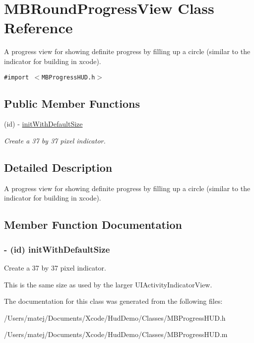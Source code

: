 \hypertarget{interface_m_b_round_progress_view}{
\section{MBRoundProgressView Class Reference}
\label{interface_m_b_round_progress_view}
}
A progress view for showing definite progress by filling up a circle (similar to the indicator for building in xcode).  


{\tt \#import $<$MBProgressHUD.h$>$}

\subsection*{Public Member Functions}
\begin{CompactItemize}
\item 
(id) - \hyperlink{interface_m_b_round_progress_view_a4794160e36b8a16ce1dd444072433e9}{initWithDefaultSize}
\begin{CompactList}\small\item\em Create a 37 by 37 pixel indicator. \item\end{CompactList}\end{CompactItemize}


\subsection{Detailed Description}
A progress view for showing definite progress by filling up a circle (similar to the indicator for building in xcode). 

\subsection{Member Function Documentation}
\hypertarget{interface_m_b_round_progress_view_a4794160e36b8a16ce1dd444072433e9}{
\subsubsection[{initWithDefaultSize}]{\setlength{\rightskip}{0pt plus 5cm}- (id) initWithDefaultSize }}
\label{interface_m_b_round_progress_view_a4794160e36b8a16ce1dd444072433e9}


Create a 37 by 37 pixel indicator. 

This is the same size as used by the larger UIActivityIndicatorView. 

The documentation for this class was generated from the following files:\begin{CompactItemize}
\item 
/Users/matej/Documents/Xcode/HudDemo/Classes/MBProgressHUD.h\item 
/Users/matej/Documents/Xcode/HudDemo/Classes/MBProgressHUD.m\end{CompactItemize}
